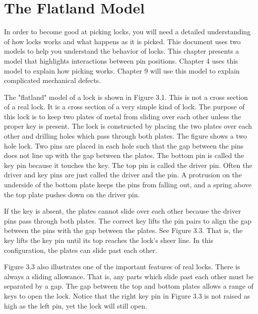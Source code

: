 \chapter{The Flatland Model}

In order to become good at picking locks, you will need a detailed understanding of how
locks works and what happens as it is picked. This document uses two models to help you
understand the behavior of locks. This chapter presents a model that highlights interactions
between pin positions. Chapter 4 uses this model to explain how picking works. Chapter 9
will use this model to explain complicated mechanical defects.

The "flatland" model of a lock is shown in Figure 3.1. This is not a cross section of a
real lock. It is a cross section of a very simple kind of lock. The purpose of this lock is to
keep two plates of metal from sliding over each other unless the proper key is present. The
lock is constructed by placing the two plates over each other and drilling holes which pass
through both plates. The figure shows a two hole lock. Two pins are placed in each hole
such that the gap between the pins does not line up with the gap between the plates. The
bottom pin is called the key pin because it touches the key. The top pin is called the driver
pin. Often the driver and key pins are just called the driver and the pin. A protrusion on
the underside of the bottom plate keeps the pins from falling out, and a spring above the
top plate pushes down on the driver pin.

If the key is absent, the plates cannot slide over each other because the driver pins pass
through both plates. The correct key lifts the pin pairs to align the gap between the pins
with the gap between the plates. See Figure 3.3. That is, the key lifts the key pin until its
top reaches the lock's sheer line. In this configuration, the plates can slide past each other.

Figure 3.3 also illustrates one of the important features of real locks. There is always a
sliding allowance. That is, any parts which slide past each other must be separated by a
gap. The gap between the top and bottom plates allows a range of keys to open the lock.
Notice that the right key pin in Figure 3.3 is not raised as high as the left pin, yet the lock
will still open.
